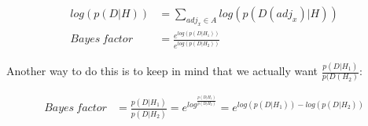 \documentclass{article}
\begin{document}
\begin{align}
\label{eq:log-version}
log(p(D|H)) &= \sum_{adj_x\in A} log(p(D(adj_x)|H)) \\ 
Bayes\ factor &= \frac{e^{log(p(D|H_1))}}{e^{log(p(D|H_2))}}
\end{align}

Another way to do this is to keep in mind that we actually want $\frac{p(D|H_1)}{p(D(H_2)}$:

\begin{align}
\label{eq:log-version2}
Bayes\ factor &= \frac{p(D|H_1)}{p(D|H_2)}
 = e^{log^{\frac{p(D|H_1)}{p(D|H_2)}}} 
 = e^{log(p(D|H_1)) - log(p(D|H_2))}
\end{align}
\end{document}
